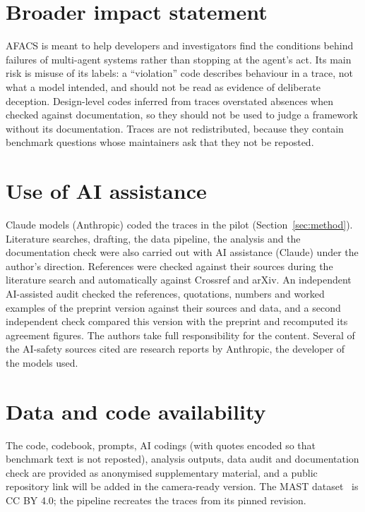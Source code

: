 \documentclass[10pt]{article}
\begin{document}
\section*{Broader impact statement}

AFACS is meant to help developers and investigators find the conditions behind
failures of multi-agent systems rather than stopping at the agent's act. Its main
risk is misuse of its labels: a ``violation'' code describes behaviour in a trace,
not what a model intended, and should not be read as evidence of deliberate
deception. Design-level codes inferred from traces overstated absences when checked
against documentation, so they should not be used to judge a framework without its
documentation. Traces are not redistributed, because they contain benchmark
questions whose maintainers ask that they not be reposted.

\section*{Use of AI assistance}

Claude models (Anthropic) coded the traces in the pilot (Section~\ref{sec:method}).
Literature searches, drafting, the data pipeline, the analysis and the
documentation check were also carried out with AI assistance (Claude) under the
author's direction. References were checked against their sources during the literature search and automatically against Crossref and arXiv. An independent AI-assisted audit checked the references, quotations, numbers and worked examples of the preprint version against their sources and data, and a second independent check compared this version with the preprint and recomputed its agreement figures. The authors take full responsibility for the content. Several of the AI-safety sources cited are
research reports by Anthropic, the developer of the models used.

\section*{Data and code availability}

The code, codebook, prompts, AI codings (with quotes encoded so that benchmark text
is not reposted), analysis outputs, data audit and documentation check are provided
as anonymised supplementary material, and a public repository link will be added in
the camera-ready version. The MAST dataset~\citep{cemri2025mast} is CC BY 4.0; the
pipeline recreates the traces from its pinned revision.
\end{document}
